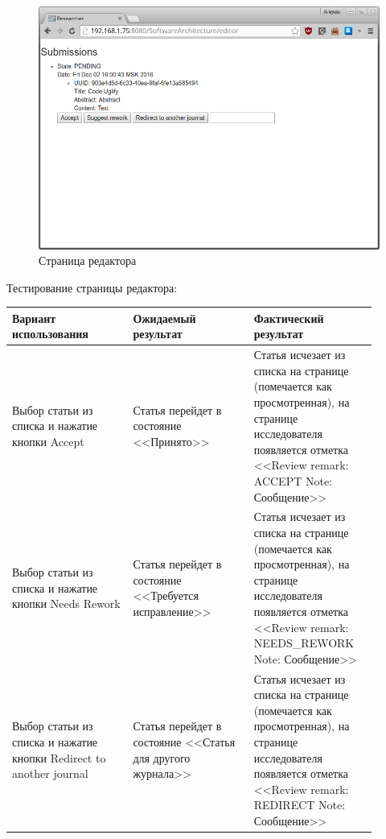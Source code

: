 \begin{figure}[H]
\centering
\includegraphics[width=\textwidth]{editor.png}
\caption{Страница редактора}
\end{figure}
Тестирование страницы редактора:
\begin{center}
	\begin{longtable}{|p{0.3\linewidth}|p{0.3\linewidth}|p{0.3\linewidth}|}
		\hline
		\textbf{Вариант использования} & \textbf{Ожидаемый результат}&
		\textbf{Фактический результат}\\
		\hline
		Выбор статьи из списка и нажатие кнопки Accept & Статья перейдет в состояние <<Принято>> & Статья исчезает из списка на странице (помечается как просмотренная), на странице исследователя появляется отметка <<Review remark: ACCEPT Note: Сообщение>> \\
		\hline
		Выбор статьи из списка и нажатие кнопки Needs Rework & Статья перейдет в состояние <<Требуется исправление>> & Статья исчезает из списка на странице (помечается как просмотренная), на странице исследователя появляется отметка <<Review remark: NEEDS\_REWORK Note: Сообщение>> \\
		\hline
		Выбор статьи из списка и нажатие кнопки Redirect to another journal & Статья перейдет в состояние <<Статья для другого журнала>> & Статья исчезает из списка на странице (помечается как просмотренная), на странице исследователя появляется отметка <<Review remark: REDIRECT Note: Сообщение>> \\
		\hline
	\end{longtable}
\end{center}

